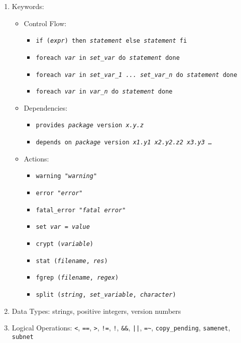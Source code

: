     \begin{enumerate}
    \item Keywords:

      \begin{itemize}
      \item Control Flow:

        \begin{itemize}
        \item \texttt{if (\textit{expr}) then \textit{statement} else \textit{statement} fi}
        \item \texttt{foreach \textit{var} in \textit{set\_var} do \textit{statement} done}
        \item \texttt{foreach \textit{var} in \textit{set\_var\_1 ... set\_var\_n} do \textit{statement} done}
        \item \texttt{foreach \textit{var} in \textit{var\_n} do \textit{statement} done}
        \end{itemize}

      \item
        Dependencies:
        \begin{itemize}
        \item \texttt{provides \textit{package} version \textit{x.y.z}}
        \item \texttt{depends on \textit{package} version \textit{x1.y1 x2.y2.z2 x3.y3 \ldots}}
        \end{itemize}

      \item Actions:
        \begin{itemize}
        \item \texttt{warning "\textit{warning}"}
        \item \texttt{error   "\textit{error}"}
        \item \texttt{fatal\_error "\textit{fatal error}"}
        \item \texttt{set \textit{var} = \textit{value}}
        \item \texttt{crypt (\textit{variable})}
        \item \texttt{stat (\textit{filename}, \textit{res})}
        \item \texttt{fgrep (\textit{filename}, \textit{regex})}
        \item \texttt{split (\textit{string}, \textit{set\_variable}, \textit{character})}
        \end{itemize}
      \end{itemize}
    \item Data Types:      strings, positive integers, version numbers
    \item Logical Operations:    \texttt{<}, \texttt{==}, \texttt{>}, \texttt{!=}, \texttt{!}, \texttt{\&\&}, \texttt{||},
      \texttt{=}\verb+~+, \texttt{copy\_pending}, \texttt{samenet}, \texttt{subnet}
    \end{enumerate}


